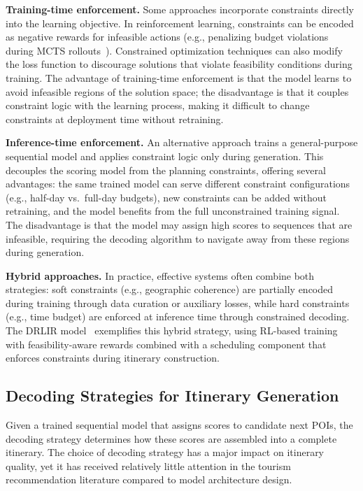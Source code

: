 \textbf{Training-time enforcement.} Some approaches incorporate constraints directly into the learning objective. In reinforcement learning, constraints can be encoded as negative rewards for infeasible actions (e.g., penalizing budget violations during MCTS rollouts~\cite{lim2017persq, halder2022effitour}). Constrained optimization techniques can also modify the loss function to discourage solutions that violate feasibility conditions during training. The advantage of training-time enforcement is that the model learns to avoid infeasible regions of the solution space; the disadvantage is that it couples constraint logic with the learning process, making it difficult to change constraints at deployment time without retraining.

\textbf{Inference-time enforcement.} An alternative approach trains a general-purpose sequential model and applies constraint logic only during generation. This decouples the scoring model from the planning constraints, offering several advantages: the same trained model can serve different constraint configurations (e.g., half-day vs.\ full-day budgets), new constraints can be added without retraining, and the model benefits from the full unconstrained training signal. The disadvantage is that the model may assign high scores to sequences that are infeasible, requiring the decoding algorithm to navigate away from these regions during generation.

\textbf{Hybrid approaches.} In practice, effective systems often combine both strategies: soft constraints (e.g., geographic coherence) are partially encoded during training through data curation or auxiliary losses, while hard constraints (e.g., time budget) are enforced at inference time through constrained decoding. The DRLIR model~\cite{halder2025drlir} exemplifies this hybrid strategy, using RL-based training with feasibility-aware rewards combined with a scheduling component that enforces constraints during itinerary construction.

\subsection{Decoding Strategies for Itinerary Generation}
\label{sec:sota-decoding-strategies}

Given a trained sequential model that assigns scores to candidate next POIs, the decoding strategy determines how these scores are assembled into a complete itinerary. The choice of decoding strategy has a major impact on itinerary quality, yet it has received relatively little attention in the tourism recommendation literature compared to model architecture design.

